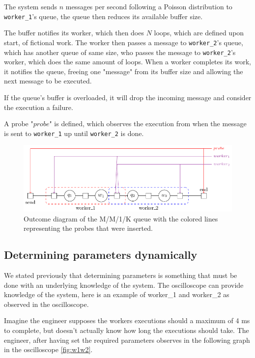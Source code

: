     The system sends $n$ messages per second following a Poisson distribution to \texttt{worker\_1}'s queue, the queue then reduces its available buffer size.
    
    The buffer notifies its worker, which then does $N$ loops, which are defined upon start, of fictional work. The worker then passes a message to \texttt{worker\_2}'s queue, which has another queue of same size, who passes the message to \texttt{worker\_2}'s worker, which does the same amount of loops. When a worker completes its work, it notifies the queue, freeing one "message" from its buffer size and allowing the next message to be executed.
    
    If the queue's buffer is overloaded, it will drop the incoming message and consider the execution a failure.
    
    A probe "$probe$" is defined, which observes the execution from when the message is sent to \texttt{worker\_1} up until \texttt{worker\_2} is done.
    \begin{figure}[H]
        \begin{center}
            \includegraphics[scale=1.2, width=\textwidth]{tikz/mm1k.pdf} 
        \end{center}
        \caption{Outcome diagram of the M/M/1/K queue with the colored lines representing the probes that were inserted.}
        \label{fig:mm1k}
    \end{figure}

    \subsection{Determining parameters dynamically}
        We stated previously that determining parameters is something that must be done with an underlying knowledge of the system. The oscilloscope can provide knowledge of the system, here is an example of worker\_1 and worker\_2 as observed in the oscilloscope.

        Imagine the engineer supposes the workers executions should a maximum of 4 ms to complete, but doesn't actually know how long the executions should take. The engineer, after having set the required parameters observes in the following graph in the oscilloscope \cref{fig:w1w2}.

